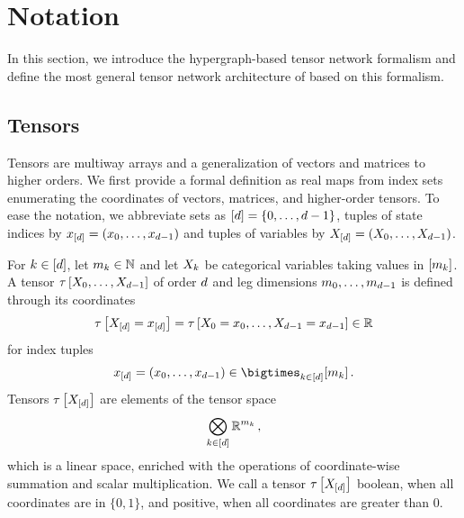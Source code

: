 \chapter{Notation}\label{sec:notation}



In this section, we introduce the hypergraph-based tensor network formalism and define the most general tensor network architecture of \CompActNets{} based on this formalism.

\section{Tensors}
\label{sec:tensors}

Tensors are multiway arrays and a generalization of vectors and matrices to higher orders.
We first provide a formal definition as real maps from index sets enumerating the coordinates of vectors, matrices, and higher-order tensors.
To ease the notation, we abbreviate sets as $[d]=\{0,\ldots,d-1\}$, tuples of state indices by $x_{[d]}=(x_{0},\ldots,x_{d-1})$ and tuples of variables by $X_{[d]}=(X_{0},\ldots,X_{d-1})$.

\begin{definition}[Tensor]
    \label{def:tensor}
    For $k\in[d]$, let $m_{k}\in\mathbb{N}$ and let $X_{k}$ be categorical variables taking values in $[m_{k}]$.
    A tensor $\tau\left[X_{0},\ldots,X_{d-1}\right]$ of order $d$ and leg dimensions $m_{0},\dots,m_{d-1}$ is defined through its coordinates
    \begin{align*}
        \tau\left[X_{[d]}=x_{[d]}\right] =
        \tau\left[X_{0}=x_{0},\ldots,X_{d-1}=x_{d-1}\right] \in \mathbb{R}
    \end{align*}
    for index tuples
    \begin{align*}
        \shortcatindices=(\catindexof{0},\ldots,\catindexof{\catorder-1}) \in \facstates \, .
    \end{align*}
    Tensors $\tau\left[X_{[d]}\right]$ are elements of the tensor space
    \begin{align*}
        \bigotimes_{k\in[d]} \mathbb{R}^{m_{k}} \,,
    \end{align*}
    which is a linear space, enriched with the operations of coordinate-wise summation and scalar multiplication.
    We call a tensor $\tau\left[X_{[d]}\right]$ boolean, when all coordinates are in $\{0,1\}$, and positive, when all coordinates are greater than $0$.
\end{definition}

